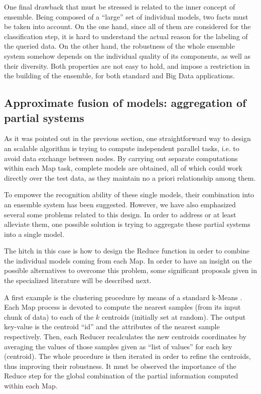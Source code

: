 \documentclass[3p,review]{elsarticle}
\begin{document}
One final drawback that must be stressed is related to the inner concept of ensemble. Being composed of a ``large'' set of individual models, two facts must be taken into account. On the one hand, since all of them are considered for the classification step, it is hard to understand the actual reason for the labeling of the queried data. On the other hand, the robustness of the whole ensemble system somehow depends on the individual quality of its components, as well as their diversity. Both properties are not easy to hold, and impose a restriction in the building of the ensemble, for both standard and Big Data applications.

\subsection{Approximate fusion of models: aggregation of partial systems}\label{subsec:submodels}

As it was pointed out in the previous section, one straightforward way to design an scalable algorithm is trying to compute independent parallel tasks, i.e. to avoid data exchange between nodes. By carrying out separate computations within each Map task, complete models are obtained, all of which could work directly over the test data, as they maintain no a priori relationship among them. %

To empower the recognition ability of these single models, their combination into an ensemble system has been suggested. However, we have also emphasized several some problems related to this design. In order to address or at least alleviate them, one possible solution is trying to aggregate these partial systems into a single model. 

The hitch in this case is how to design the Reduce function in order to combine the individual models coming from each Map. In order to have an insight on the possible alternatives to overcome this problem, some significant proposals given in the specialized literature will be described next.

A first example is the clustering procedure by means of a standard k-Means \cite{Zhao09-kMeans}. Each Map process is devoted to compute the nearest samples (from its input chunk of data) to each of the $k$ centroids (initially set at random). The output key-value is the centroid ``id'' and the attributes of the nearest sample respectively. Then, each Reducer recalculates the new centroids coordinates by averaging the values of those samples given as ``list of values'' for each key (centroid). The whole procedure is then iterated in order to refine the centroids, thus improving their robustness. It must be observed the importance of the Reduce step for the global combination of the partial information computed within each Map.  
\end{document}
